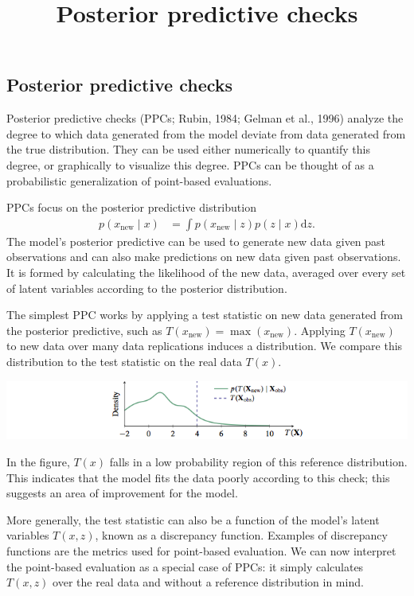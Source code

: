 \title{Posterior predictive checks}

\subsection{Posterior predictive checks}

Posterior predictive checks (PPCs; Rubin, 1984; Gelman et al., 1996)
analyze the degree to which data generated from the model deviate from
data generated from the true distribution. They can be used either
numerically to quantify this degree, or graphically to visualize this
degree. PPCs can be thought of as a probabilistic generalization of
point-based evaluations.

PPCs focus on the posterior predictive distribution
\begin{align*}
  p(x_\text{new} \mid x)
  &=
  \int
  p(x_\text{new} \mid z)
  p(z \mid x)
  \text{d} z.
\end{align*}
The model's posterior predictive can be used to generate new data
given past observations and can also make predictions on new data
given past observations.
It is formed by calculating the likelihood of the new data, averaged
over every set of latent variables according to the posterior
distribution.

The simplest PPC works by applying a test statistic on new data
generated from the posterior predictive, such as
$T(x_\text{new}) = \max(x_\text{new})$.  Applying $T(x_\text{new})$ to
new data over many data replications induces a distribution. We compare
this distribution to the test statistic on the real data $T(x)$.

\includegraphics{images/ppc.png}

In the figure, $T(x)$ falls in a low probability region of this
reference distribution. This indicates that the model fits the data
poorly according to this check; this suggests an area of improvement
for the model.

More generally, the test statistic can also be a function of the
model's latent variables $T(x, z)$, known as a discrepancy function.
Examples of discrepancy functions are the metrics used for point-based
evaluation. We can now interpret the point-based evaluation as a
special case of PPCs: it simply calculates $T(x, z)$ over the real
data and without a reference distribution in mind.

